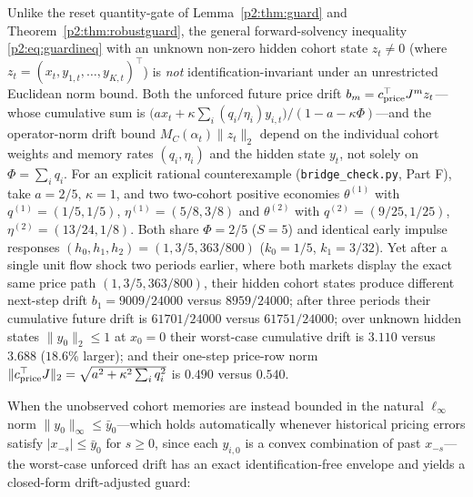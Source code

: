 Unlike the reset quantity-gate of Lemma~\ref{p2:thm:guard} and Theorem~\ref{p2:thm:robustguard}, the general forward-solvency inequality \eqref{p2:eq:guardineq} with an unknown non-zero hidden cohort state $z_t\neq 0$ (where $z_t=(x_t,y_{1,t},\ldots,y_{K,t})^\top$) is \emph{not} identification-invariant under an unrestricted Euclidean norm bound. Both the unforced future price drift $b_m=c_{\rm price}^\top J^m z_t$---whose cumulative sum is $\bigl(a x_t+\kappa\sum_i(q_i/\eta_i)y_{i,t}\bigr)/(1-a-\kappa\Phi)$---and the operator-norm drift bound $M_C(\alpha_t)\|z_t\|_2$ depend on the individual cohort weights and memory rates $(q_i,\eta_i)$ and the hidden state $y_t$, not solely on $\Phi=\sum_i q_i$. For an explicit rational counterexample (\texttt{bridge\_check.py}, Part F), take $a=2/5$, $\kappa=1$, and two two-cohort positive economies $\theta^{(1)}$ with $q^{(1)}=(1/5,1/5)$, $\eta^{(1)}=(5/8,3/8)$ and $\theta^{(2)}$ with $q^{(2)}=(9/25,1/25)$, $\eta^{(2)}=(13/24,1/8)$. Both share $\Phi=2/5$ ($S=5$) and identical early impulse responses $(h_0,h_1,h_2)=(1,3/5,363/800)$ ($k_0=1/5$, $k_1=3/32$). Yet after a single unit flow shock two periods earlier, where both markets display the exact same price path $(1,3/5,363/800)$, their hidden cohort states produce different next-step drift $b_1=9009/24000$ versus $8959/24000$; after three periods their cumulative future drift is $61701/24000$ versus $61751/24000$; over unknown hidden states $\|y_0\|_2\le 1$ at $x_0=0$ their worst-case cumulative drift is $3.110$ versus $3.688$ ($18.6\%$ larger); and their one-step price-row norm $\|c_{\rm price}^\top J\|_2=\sqrt{a^2+\kappa^2\sum_i q_i^2}$ is $0.490$ versus $0.540$.

When the unobserved cohort memories are instead bounded in the natural $\ell_\infty$ norm $\|y_0\|_\infty\le\bar y_0$---which holds automatically whenever historical pricing errors satisfy $|x_{-s}|\le\bar y_0$ for $s\ge0$, since each $y_{i,0}$ is a convex combination of past $x_{-s}$---the worst-case unforced drift has an exact identification-free envelope and yields a closed-form drift-adjusted guard:

